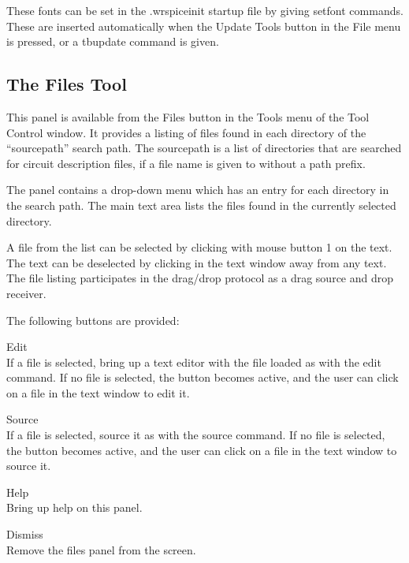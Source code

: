 These fonts can be set in the {\vt .wrspiceinit} startup file by
giving {\cb setfont} commands.  These are inserted automatically when
the {\cb Update Tools} button in the {\cb File} menu is pressed, or a
{\cb tbupdate} command is given.

\subsection{The Files Tool}
\label{filespanel}

This panel is available from the {\cb Files} button in the {\cb Tools}
menu of the {\cb Tool Control} window.  It provides a listing of files
found in each directory of the ``{\vt sourcepath}'' search path.  The
{\et sourcepath} is a list of directories that are searched for
circuit description files, if a file name is given to {\WRspice}
without a path prefix.

The panel contains a drop-down menu which has an entry for each
directory in the search path.  The main text area lists the files
found in the currently selected directory.

A file from the list can be selected by clicking with mouse button 1
on the text.  The text can be deselected by clicking in the text
window away from any text.  The file listing participates in the
drag/drop protocol as a drag source and drop receiver.

The following buttons are provided:

\begin{description}
\item{\cb Edit}\\
    If a file is selected, bring up a text editor with the
    file loaded as with the {\cb edit} command.  If
    no file is selected, the button becomes active, and the user
    can click on a file in the text window to edit it.
\item{\cb Source}\\
    If a file is selected, source it as with the {\cb source}
    command.  If no file is selected, the button becomes active,
    and the user can click on a file in the text window to source
    it.
\item{\cb Help}\\
    Bring up help on this panel.
\item{\cb Dismiss}\\
    Remove the files panel from the screen.
\end{description}


